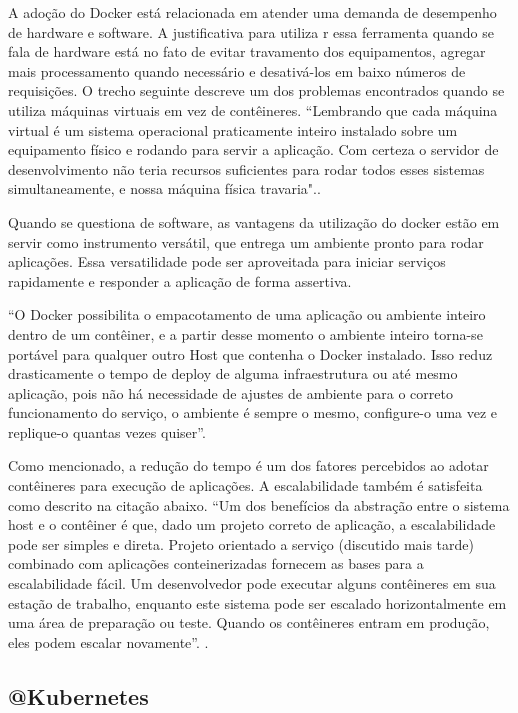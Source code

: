 A adoção do Docker está relacionada em atender uma demanda de desempenho de hardware e software. A justificativa para utiliza
r essa ferramenta quando se fala de hardware está no fato de evitar travamento dos equipamentos, agregar mais processamento 
quando necessário e desativá-los em baixo números de requisições.
O trecho seguinte descreve um dos problemas encontrados quando se utiliza máquinas virtuais em vez de contêineres. “Lembrando
que cada máquina virtual é um sistema operacional praticamente inteiro instalado sobre um equipamento físico e rodando para
servir a aplicação. Com certeza o servidor de desenvolvimento não teria recursos suficientes para rodar todos esses sistemas
simultaneamente, e nossa máquina física travaria".\cite {aprendendo-docker}.


Quando se questiona de software, as vantagens da utilização do docker estão em servir como instrumento versátil, que entrega
um ambiente pronto para rodar aplicações. Essa versatilidade pode ser aproveitada para iniciar serviços rapidamente e responder
a aplicação de forma assertiva.


“O Docker possibilita o empacotamento de uma aplicação ou ambiente inteiro dentro de um contêiner, e a partir desse momento o
ambiente inteiro torna-se portável para qualquer outro Host que contenha o Docker instalado.
Isso reduz drasticamente o tempo de deploy de alguma infraestrutura ou até mesmo aplicação, pois não há necessidade de ajustes
de ambiente para o correto funcionamento do serviço, o ambiente é sempre o mesmo, configure-o uma vez e replique-o quantas vezes
quiser”. \cite {mundodocker-02}


Como mencionado, a redução do tempo é um dos fatores percebidos ao adotar contêineres para execução de aplicações. A
escalabilidade também é satisfeita como descrito na citação abaixo.
“Um dos benefícios da abstração entre o sistema host e o contêiner é que, dado um projeto correto de aplicação, a 
escalabilidade pode ser simples e direta. Projeto orientado a serviço (discutido mais tarde) combinado com aplicações
conteinerizadas fornecem as bases para a escalabilidade fácil.
Um desenvolvedor pode executar alguns contêineres em sua estação de trabalho, enquanto este sistema pode ser escalado
horizontalmente em uma área de preparação ou teste. Quando os contêineres entram em produção, eles podem escalar novamente”. \cite {digitalocean-01}.

\subsection{@Kubernetes}\label{kubernetes}

